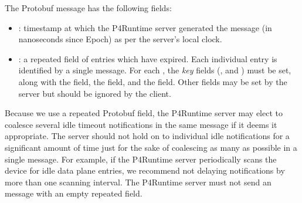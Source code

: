 \documentclass[11pt]{article}
\begin{document}
{%
The  Protobuf message has the following fields:%

\begin{itemize}%

\item{}
: timestamp at which the P4Runtime server generated the message (in
nanoseconds since Epoch) as per the server's local clock.%

\item{}
: a repeated field of entries which have expired. Each individual
entry is identified by a single  message. For each ,
the \emph{key} fields (,  and ) must be set, along with
the  field, the  field, and the
 field. Other fields may be set by the server but should be
ignored by the client.%
\end{itemize}%

\noindent{}Because we use a repeated Protobuf field, the P4Runtime server may elect to
coalesce several idle timeout notifications in the same
 message if it deems it appropriate. The server should
not hold on to individual idle notifications for a significant amount of time
just for the sake of coalescing as many as possible in a single message. For
example, if the P4Runtime server periodically scans the device for idle data
plane entries, we recommend not delaying notifications by more than one scanning
interval. The P4Runtime server must not send an 
message with an empty  repeated field.%

}
\end{document}
